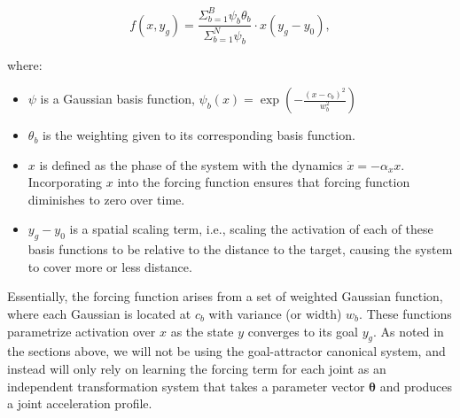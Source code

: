 \documentclass[10pt]{article}
\begin{document}
\begin{equation}
    f(x,y_g) = \frac{\Sigma_{b = 1}^{B} \psi_b \theta_b}{\Sigma_{b = 1}^{N} \psi_b}  \cdot x(y_g - y_0),
\end{equation}

where:
\begin{itemize}
	\item $\psi$ is a Gaussian basis function, $\psi_b(x) = \exp\left(-\frac{(x - c_b)^2}{w_b^2}\right)$
	\item $\theta_b$ is the weighting given to its corresponding basis function.
    \item $x$ is defined as the phase of the system with the dynamics $\dot{x} = - \alpha_x x$. Incorporating $x$ into the forcing function ensures that forcing function diminishes to zero over time. 
	\item $y_g - y_0$ is a spatial scaling term, i.e., scaling the activation of each of these basis functions to be relative to the distance to the target, causing the system to cover more or less distance.
\end{itemize}

Essentially, the forcing function arises from a set of weighted Gaussian function, where each Gaussian is located at $c_b$ with variance (or width) $w_b$. These functions parametrize activation over $x$ as the state $y$ converges to its goal $y_g$. As noted in the sections above, we will not be using the goal-attractor canonical system, and instead will only rely on learning the forcing term for each joint as an independent transformation system that takes a parameter vector $\boldsymbol\theta$ and produces a joint acceleration profile.
\end{document}
